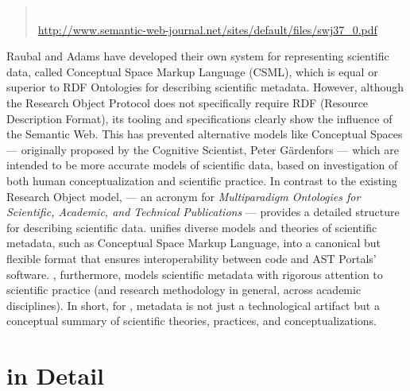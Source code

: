 \documentclass[10pt,letterpaper]{article}
\newcommand{\rpdfLink}[1]{\href{#1}{\small{#1}}}
\begin{document}
\begin{quote}{}\\
\rpdfLink{http://www.semantic-web-journal.net/sites/default/files/swj37\_0.pdf}
\end{quote}

Raubal and Adams have developed their own system 
for representing scientific data, called Conceptual 
Space Markup Language (CSML), which is  
equal or superior to RDF Ontologies for describing 
scientific metadata.  However, 
although the Research Object Protocol 
does not specifically require RDF (Resource Description 
Format), its tooling and specifications clearly 
show the influence of the Semantic Web.  
This has prevented alternative models like 
Conceptual Spaces --- originally proposed 
by the Cognitive Scientist, Peter G\"ardenfors 
--- which are intended to be more 
accurate models of scientific data, based on investigation 
of both human conceptualization and scientific practice. 
\p{} 
In contrast to the existing Research Object model, 
{\MOSAIC} --- an acronym for \textit{Multiparadigm 
Ontologies for Scientific, Academic, and Technical Publications} 
--- provides a detailed structure for 
describing scientific data.  
{\lfMOSAIC} unifies diverse models and theories of 
scientific metadata, such as Conceptual 
Space Markup Language, into a canonical but flexible format 
that ensures interoperability between {\RO} code 
and AST Portals' software.  {\lfMOSAIC}, furthermore, 
models scientific metadata with rigorous attention 
to scientific practice (and research methodology 
in general, across academic disciplines).  In 
short, for {\MOSAIC}, metadata is not just a technological 
artifact but a conceptual summary of scientific theories, 
practices, and conceptualizations.  
\p{}
\section{{\lMOSAIC} in Detail}
\end{document}
